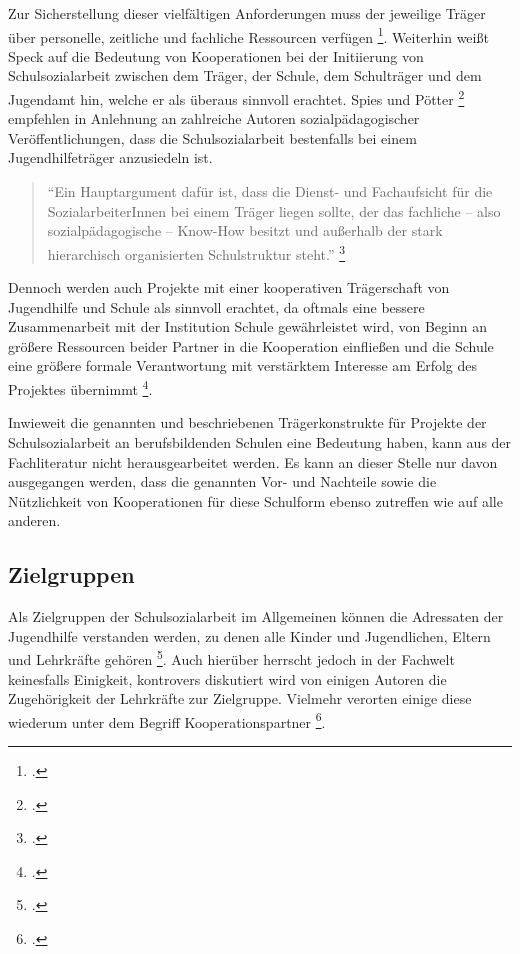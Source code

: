 Zur Sicherstellung dieser vielfältigen Anforderungen muss der jeweilige Träger über personelle, zeitliche und fachliche Ressourcen verfügen \footcite[vgl.]{BIVSD2013}. Weiterhin weißt Speck auf die Bedeutung von Kooperationen bei der Initiierung von Schulsozialarbeit zwischen dem Träger, der Schule, dem Schulträger und dem Jugendamt hin, welche er als überaus sinnvoll erachtet. Spies und Pötter \footcite[64]{Spies2011} empfehlen in Anlehnung an zahlreiche Autoren sozialpädagogischer Veröffentlichungen, dass die Schulsozialarbeit bestenfalls bei einem Jugendhilfeträger anzusiedeln ist. 

\begin{quotation}
\noindent
"`Ein Hauptargument dafür ist, dass die Dienst- und Fachaufsicht für die SozialarbeiterInnen bei einem Träger liegen sollte, der das fachliche -- also sozialpädagogische -- Know-How besitzt und außerhalb der stark hierarchisch organisierten Schulstruktur steht."' \footcite[64]{Spies2011}
\end{quotation}

Dennoch werden auch Projekte mit einer kooperativen Trägerschaft von Jugendhilfe und Schule als sinnvoll erachtet, da oftmals eine bessere Zusammenarbeit mit der Institution Schule gewährleistet wird, von Beginn an größere Ressourcen beider Partner in die Kooperation einfließen und die Schule eine größere formale Verantwortung mit verstärktem Interesse am Erfolg des Projektes übernimmt \footcite[vgl.][64]{Spies2011}.

Inwieweit die genannten und beschriebenen Trägerkonstrukte für Projekte der Schulsozialarbeit  an berufsbildenden Schulen eine Bedeutung haben, kann aus der Fachliteratur nicht herausgearbeitet werden. Es kann an dieser Stelle nur davon ausgegangen werden, dass die genannten Vor- und Nachteile sowie die Nützlichkeit von Kooperationen für diese Schulform ebenso zutreffen wie auf alle anderen. 

\subsection{Zielgruppen}
\label{sec:Zielgruppen}

Als Zielgruppen der Schulsozialarbeit im Allgemeinen können die Adressaten der Jugendhilfe verstanden werden, zu denen alle Kinder und Jugendlichen, Eltern und Lehrkräfte gehören \footcite[vgl.][31]{Speck2007}. Auch hierüber herrscht jedoch in der Fachwelt keinesfalls Einigkeit, kontrovers diskutiert wird von einigen Autoren die Zugehörigkeit der Lehrkräfte zur Zielgruppe. Vielmehr verorten einige diese wiederum unter dem Begriff Kooperationspartner \footcite[vgl.][50]{Spies2011}. 

